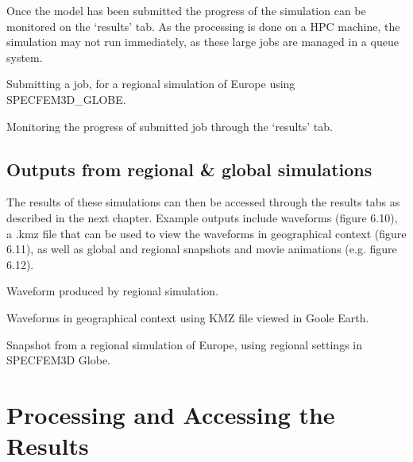 \documentclass[english]{book}
\begin{document}
Once the model has been submitted the progress of the simulation can be
monitored on the ‘results’ tab. As the processing is done on a HPC
machine, the simulation may not run immediately, as these large jobs are
managed in a queue system.


 Submitting a job, for a regional simulation of Europe
using SPECFEM3D\_GLOBE.


 Monitoring the progress of submitted job through the
‘results’ tab.


\section{Outputs from regional \& global simulations}
\label{\detokenize{Section6:outputs-from-regional-global-simulations}}
The results of these simulations can then be accessed through the
results tabs as described in the next chapter. Example outputs include
waveforms (figure 6.10), a .kmz file that can be used to view the
waveforms in geographical context (figure 6.11), as well as global and
regional snapshots and movie animations (e.g. figure 6.12).


 Waveform produced by regional simulation.


 Waveforms in geographical context using KMZ file
viewed in Goole Earth.


 Snapshot from a regional simulation of Europe, using
regional settings in SPECFEM3D Globe.


\chapter{Processing and Accessing the Results}
\label{\detokenize{Section7::doc}}\label{\detokenize{Section7:processing-and-accessing-the-results}}
\end{document}
